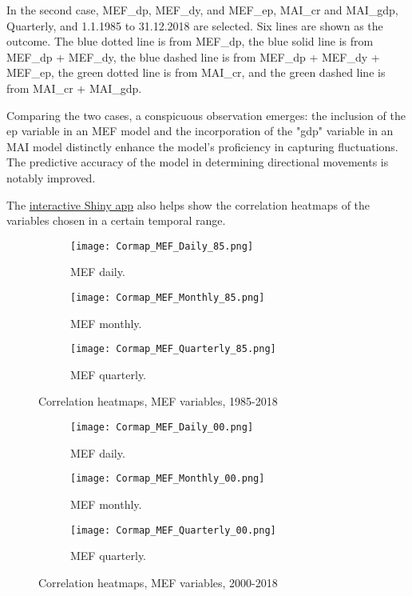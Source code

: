 \documentclass{article}
\begin{document}
\noindent In the second case, MEF\_dp, MEF\_dy, and MEF\_ep, MAI\_cr and MAI\_gdp, Quarterly, and 1.1.1985 to 31.12.2018 are selected. Six lines are shown as the outcome. The blue dotted line is from MEF\_dp, the blue solid line is from MEF\_dp + MEF\_dy, the blue dashed line is from MEF\_dp + MEF\_dy + MEF\_ep, the green dotted line is from MAI\_cr, and the green dashed line is from MAI\_cr + MAI\_gdp. 

\noindent Comparing the two cases, a conspicuous observation emerges: the inclusion of the ep variable in an MEF model and the incorporation of the "gdp" variable in an MAI model distinctly enhance the model's proficiency in capturing fluctuations. The predictive accuracy of the model in determining directional movements is notably improved.

\noindent The \href{https://baumender11.shinyapps.io/Alpha/}{interactive Shiny app} also helps show the correlation heatmaps of the variables chosen in a certain temporal range.

\begin{figure}[H]
  \centering
  \begin{subfigure}{0.3\linewidth}
    \texttt{[image: Cormap\_MEF\_Daily\_85.png]}
    \caption{MEF daily.}
  \end{subfigure}
  \hfill
  \begin{subfigure}{0.3\linewidth}
    \texttt{[image: Cormap\_MEF\_Monthly\_85.png]}
    \caption{MEF monthly.}
  \end{subfigure}
  \hfill
  \begin{subfigure}{0.3\linewidth}
    \texttt{[image: Cormap\_MEF\_Quarterly\_85.png]}
    \caption{MEF quarterly.}
  \end{subfigure}
  \caption{Correlation heatmaps, MEF variables, 1985-2018}
  \label{fig:cormap1}
\end{figure}

\begin{figure}[H]
  \centering
  \begin{subfigure}{0.3\linewidth}
    \texttt{[image: Cormap\_MEF\_Daily\_00.png]}
    \caption{MEF daily.}
  \end{subfigure}
  \hfill
  \begin{subfigure}{0.3\linewidth}
    \texttt{[image: Cormap\_MEF\_Monthly\_00.png]}
    \caption{MEF monthly.}
  \end{subfigure}
  \hfill
  \begin{subfigure}{0.3\linewidth}
    \texttt{[image: Cormap\_MEF\_Quarterly\_00.png]}
    \caption{MEF quarterly.}
  \end{subfigure}
  \caption{Correlation heatmaps, MEF variables, 2000-2018}
  \label{fig:cormap2}
\end{figure}
\end{document}
